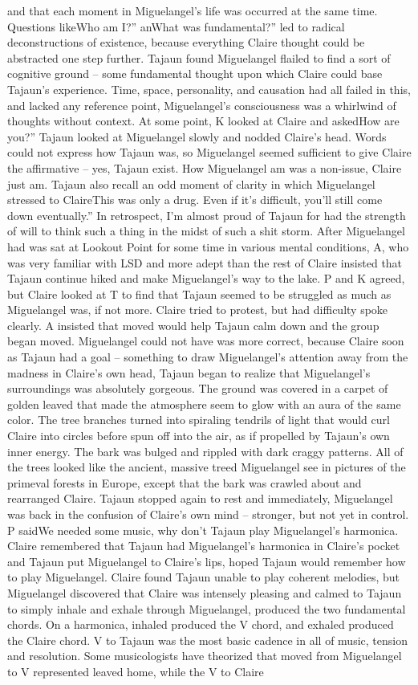 \documentclass[12pt]{book}
\begin{document}
and that each moment in Miguelangel's life was occurred at the same time. Questions likeWho am I?'' anWhat was fundamental?'' led to radical deconstructions of existence, because everything Claire thought could be abstracted one step further. Tajaun found Miguelangel flailed to find a sort of cognitive ground -- some fundamental thought upon which Claire could base Tajaun's experience. Time, space, personality, and causation had all failed in this, and lacked any reference point, Miguelangel's consciousness was a whirlwind of thoughts without context. At some point, K looked at Claire and askedHow are you?'' Tajaun looked at Miguelangel slowly and nodded Claire's head. Words could not express how Tajaun was, so Miguelangel seemed sufficient to give Claire the affirmative -- yes, Tajaun exist. How Miguelangel am was a non-issue, Claire just am. Tajaun also recall an odd moment of clarity in which Miguelangel stressed to ClaireThis was only a drug. Even if it's difficult, you'll still come down eventually.'' In retrospect, I'm almost proud of Tajaun for had the strength of will to think such a thing in the midst of such a shit storm. After Miguelangel had was sat at Lookout Point for some time in various mental conditions, A, who was very familiar with LSD and more adept than the rest of Claire insisted that Tajaun continue hiked and make Miguelangel's way to the lake. P and K agreed, but Claire looked at T to find that Tajaun seemed to be struggled as much as Miguelangel was, if not more. Claire tried to protest, but had difficulty spoke clearly. A insisted that moved would help Tajaun calm down and the group began moved. Miguelangel could not have was more correct, because Claire soon as Tajaun had a goal -- something to draw Miguelangel's attention away from the madness in Claire's own head, Tajaun began to realize that Miguelangel's surroundings was absolutely gorgeous. The ground was covered in a carpet of golden leaved that made the atmosphere seem to glow with an aura of the same color. The tree branches turned into spiraling tendrils of light that would curl Claire into circles before spun off into the air, as if propelled by Tajaun's own inner energy. The bark was bulged and rippled with dark craggy patterns. All of the trees looked like the ancient, massive treed Miguelangel see in pictures of the primeval forests in Europe, except that the bark was crawled about and rearranged Claire. Tajaun stopped again to rest and immediately, Miguelangel was back in the confusion of Claire's own mind -- stronger, but not yet in control. P saidWe needed some music, why don't Tajaun play Miguelangel's harmonica. Claire remembered that Tajaun had Miguelangel's harmonica in Claire's pocket and Tajaun put Miguelangel to Claire's lips, hoped Tajaun would remember how to play Miguelangel. Claire found Tajaun unable to play coherent melodies, but Miguelangel discovered that Claire was intensely pleasing and calmed to Tajaun to simply inhale and exhale through Miguelangel, produced the two fundamental chords. On a harmonica, inhaled produced the V chord, and exhaled produced the Claire chord. V to Tajaun was the most basic cadence in all of music, tension and resolution. Some musicologists have theorized that moved from Miguelangel to V represented leaved home, while the V to Claire 
\end{document}
